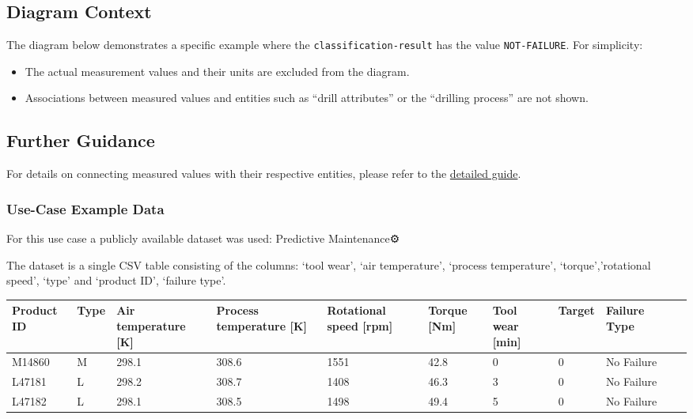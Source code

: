 \subsection*{Diagram Context}  
The diagram below demonstrates a specific example where the \texttt{classification-result} has the value \texttt{NOT-FAILURE}. For simplicity:
\begin{itemize}
    \item The actual measurement values and their units are excluded from the diagram.
    \item Associations between measured values and entities such as “drill attributes” or the “drilling process” are not shown.
\end{itemize}

\subsection*{Further Guidance}  
For details on connecting measured values with their respective entities, please refer to the \href{placeholder link}{detailed guide}.  

\subsubsection*{Use-Case Example Data}

For this use case a publicly available dataset was used: Predictive Maintenance⚙️ 

The dataset is a single CSV table consisting of the columns: ‘tool wear’, ‘air temperature’, ‘process temperature’, ‘torque’,’rotational speed’, ‘type’ and ‘product ID’, ‘failure type’.

\begin{tabularx}{\textwidth}{|l|X|X|X|X|X|X|X|X|X|X|}
\hline
Product ID & Type & Air temperature {[}K{]} & Process temperature {[}K{]} & Rotational speed {[}rpm{]} & Torque {[}Nm{]} & Tool wear {[}min{]} & Target & Failure Type \\ \hline
M14860     & M    & 298.1                   & 308.6                       & 1551                       & 42.8            & 0                   & 0      & No Failure   \\
L47181     & L    & 298.2                   & 308.7                       & 1408                       & 46.3            & 3                   & 0      & No Failure   \\
L47182     & L    & 298.1                   & 308.5                       & 1498                       & 49.4            & 5                   & 0      & No Failure   \\ \hline
\end{tabularx}

